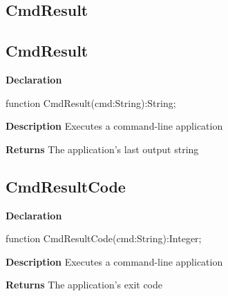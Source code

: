 \documentclass{report}
\newif\ifpdf
\begin{document}
\subsection*{\large{\textbf{CmdResult}}\normalsize\hspace{1ex}\hrulefill}
\else
\subsection*{CmdResult}
\fi
\label{common-CmdResult}
\begin{list}{}{
\setlength{\itemindent}{0cm}
\setlength{\listparindent}{0cm}
\setlength{\leftmargin}{\evensidemargin}
\addtolength{\leftmargin}{\tmplength}
\settowidth{\labelsep}{X}
\addtolength{\leftmargin}{\labelsep}
\setlength{\labelwidth}{\tmplength}
}
\item[\textbf{Declaration}\hfill]
\ifpdf
\begin{flushleft}
\fi
\begin{ttfamily}
function CmdResult(cmd:String):String;\end{ttfamily}

\ifpdf
\end{flushleft}
\fi

\par
\item[\textbf{Description}]
Executes a command{-}line application \par
\item[\textbf{Returns}]The application's last output string


\end{list}
\ifpdf
\subsection*{\large{\textbf{CmdResultCode}}\normalsize\hspace{1ex}\hrulefill}
\else
\subsection*{CmdResultCode}
\fi
\label{common-CmdResultCode}
\begin{list}{}{
\setlength{\itemindent}{0cm}
\setlength{\listparindent}{0cm}
\setlength{\leftmargin}{\evensidemargin}
\addtolength{\leftmargin}{\tmplength}
\settowidth{\labelsep}{X}
\addtolength{\leftmargin}{\labelsep}
\setlength{\labelwidth}{\tmplength}
}
\item[\textbf{Declaration}\hfill]
\ifpdf
\begin{flushleft}
\fi
\begin{ttfamily}
function CmdResultCode(cmd:String):Integer;\end{ttfamily}

\ifpdf
\end{flushleft}
\fi

\par
\item[\textbf{Description}]
Executes a command{-}line application \par
\item[\textbf{Returns}]The application's exit code


\end{list}
\ifpdf
\end{document}
